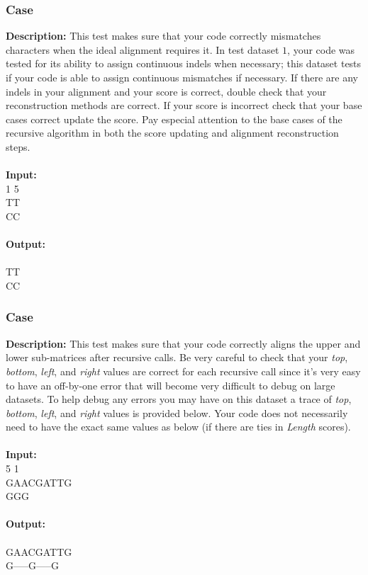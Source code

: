 \documentclass{article}
\newcommand{\code}[1]{{\fontfamily{pcr}\selectfont #1}}
\begin{document}
\subsubsection*{Case }
\hline \vspace{5}
\textbf{Description:} This test makes sure that your code correctly mismatches characters when the ideal alignment requires it. In test dataset $1$, your code was tested for its ability to assign continuous indels when necessary; this dataset tests if your code is able to assign continuous mismatches if necessary. If there are any indels in your alignment and your score is correct, double check that your reconstruction methods are correct. If your score is incorrect check that your base cases correct update the score. Pay especial attention to the base cases of the recursive algorithm in both the score updating and alignment reconstruction steps. \\ \\
\noindent \textbf{Input:}\\
\code{1 1 5\\TT\\CC}\\ \\
\noindent \textbf{Output:}\\
\code{-2\\TT\\CC}

\subsubsection*{Case }
\hline \vspace{5}
\textbf{Description:} This test makes sure that your code correctly aligns the upper and lower sub-matrices after recursive calls. Be very careful to check that your \emph{top}, \emph{bottom}, \emph{left}, and \emph{right} values are correct for each recursive call since it’s very easy to have an off-by-one error that will become very difficult to debug on large datasets. To help debug any errors you may have on this dataset a trace of \emph{top}, \emph{bottom}, \emph{left}, and \emph{right} values is provided below. Your code does not necessarily need to have the exact same values as below (if there are ties in \emph{Length} scores).\\ \\
\noindent \textbf{Input:}\\
\code{1 5 1\\GAACGATTG\\GGG}\\ \\
\noindent \textbf{Output:}\\
\code{-3\\GAACGATTG\\G-----G-----G}
\pagebreak
\end{document}

